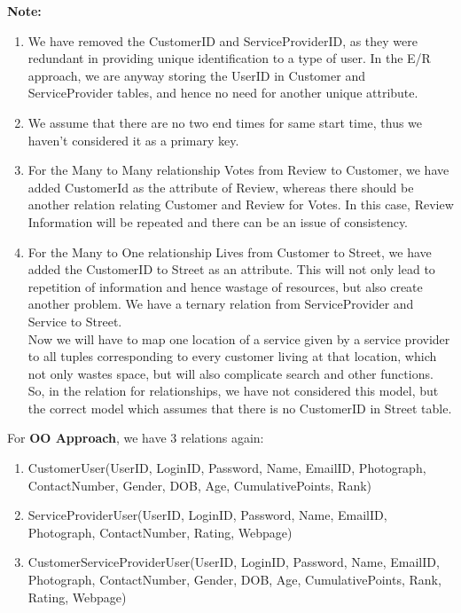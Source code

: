 \documentclass[a4paper]{article}
\begin{document}
\textbf{Note:} 
\begin{enumerate}
\item We have removed the CustomerID and ServiceProviderID, as they were redundant in providing unique identification to a type of user. In the E/R approach, we are anyway storing the UserID in Customer and ServiceProvider tables, and hence no need for another unique attribute.
\item We assume that there are no two end times for same start time, thus we haven't considered it as a primary key.
\item For the Many to Many relationship Votes from Review to Customer, we have added CustomerId as the attribute of Review, whereas there should be another relation relating Customer and Review for Votes. In this case, Review Information will be repeated and there can be an issue of consistency. 
\item For the Many to One relationship Lives from Customer to Street, we have added the CustomerID to Street as an attribute. This will not only lead to repetition of information and hence wastage of resources, but also create another problem. We have a ternary relation from ServiceProvider and Service to Street. \\Now we will have to map one location of a service given by a service provider to all tuples corresponding to every customer living at that location, which not only wastes space, but will also complicate search and other functions. So, in the relation for relationships, we have not considered this model, but the correct model which assumes that there is no CustomerID in Street table.

\end{enumerate}


For \textbf{OO Approach}, we have 3 relations again:

\begin{enumerate}
\item CustomerUser(UserID, LoginID, Password, Name, EmailID, Photograph, ContactNumber, Gender, DOB, Age, CumulativePoints, Rank)
\item ServiceProviderUser(UserID, LoginID, Password, Name, EmailID, Photograph, ContactNumber, Rating, Webpage)
\item CustomerServiceProviderUser(UserID, LoginID, Password, Name, EmailID, Photograph, ContactNumber, Gender, DOB, Age, CumulativePoints, Rank, Rating, Webpage)

\end{enumerate}
\end{document}
